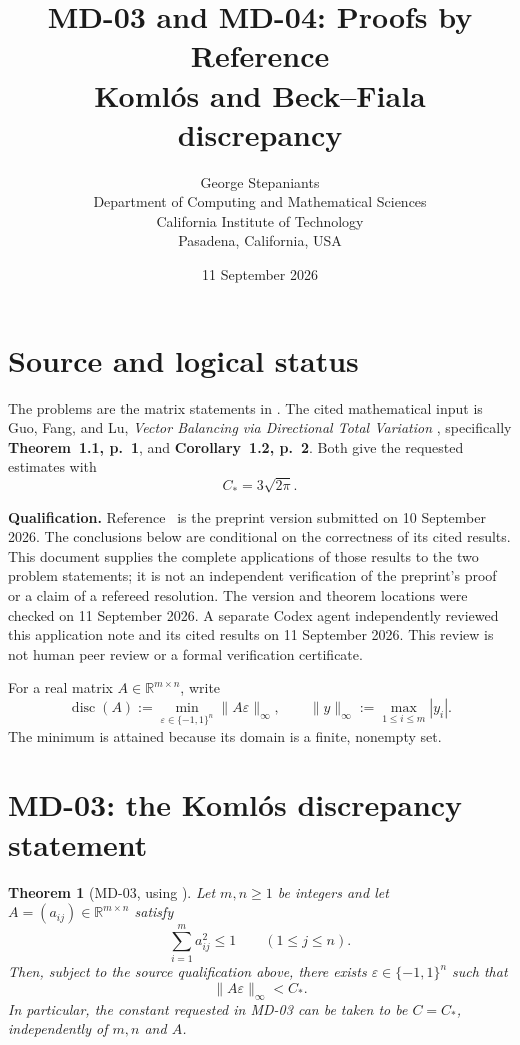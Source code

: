 \documentclass[11pt,a4paper]{article}
\title{\textbf{MD-03 and MD-04: Proofs by Reference}\\[4pt]
  \large Koml\'os and Beck--Fiala discrepancy}
\author{George Stepaniants\\[0.3em]
\small Department of Computing and Mathematical Sciences\\
\small California Institute of Technology\\
\small Pasadena, California, USA}
\date{11 September 2026}
\newcommand{\R}{\mathbb{R}}
\DeclareMathOperator{\disc}{disc}
\newcommand{\Cstar}{C_{\!*}}
\newtheorem{theorem}{Theorem}
\begin{document}
\maketitle
\vspace{-1.5em}

\section*{Source and logical status}

The problems are the matrix statements in
\cite{MD03,MD04}. The cited mathematical input is Guo, Fang, and Lu,
\emph{Vector Balancing via Directional Total Variation}
\cite{GFL26}, specifically \textbf{Theorem~1.1, p.~1}, and
\textbf{Corollary~1.2, p.~2}. Both give the requested estimates with
\[
  \boxed{\Cstar=3\sqrt{2\pi}.}
\]

\textbf{Qualification.}
Reference~\cite{GFL26} is the preprint version submitted on
10 September 2026. The conclusions below are conditional on the correctness
of its cited results. This document supplies the complete applications of
those results to the two problem statements; it is not an independent
verification of the preprint's proof or a claim of a refereed resolution.
The version and theorem locations were checked on 11 September 2026.
A separate Codex agent independently reviewed this application note and
its cited results on 11 September 2026.  This review is not human peer
review or a formal verification certificate.

For a real matrix $A\in\R^{m\times n}$, write
\[
 \disc(A):=\min_{\varepsilon\in\{-1,1\}^{n}}
             \|A\varepsilon\|_{\infty},
 \qquad
 \|y\|_{\infty}:=\max_{1\leq i\leq m}|y_i|.
\]
The minimum is attained because its domain is a finite, nonempty set.

\section{MD-03: the Koml\'os discrepancy statement}

\begin{theorem}[MD-03, using {\cite[Theorem~1.1]{GFL26}}]
Let $m,n\geq1$ be integers and let $A=(a_{ij})\in\R^{m\times n}$
satisfy
\begin{equation}\label{eq:komlos-hyp}
  \sum_{i=1}^{m}a_{ij}^{2}\leq1
  \qquad (1\leq j\leq n).
\end{equation}
Then, subject to the source qualification above, there exists
$\varepsilon\in\{-1,1\}^{n}$ such that
\begin{equation}\label{eq:komlos-conclusion}
  \|A\varepsilon\|_{\infty}<\Cstar.
\end{equation}
In particular, the constant requested in MD-03 can be taken to be
$C=\Cstar$, independently of $m,n$ and $A$.
\end{theorem}
\end{document}
